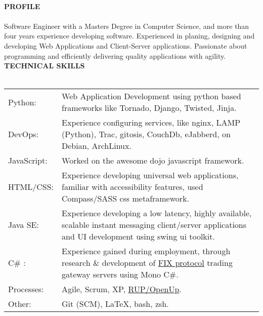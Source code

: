 \documentclass[10pt]{article}
\newcommand{\lineunder}{\vspace*{-10pt} \\ \hspace*{-18pt} \hrulefill \vspace{2pt}\\}
\newcommand{\header}[1]{{\hspace*{-15pt}\vspace*{-0pt}\\ \uppercase{\textbf {#1}}}  \lineunder}
\begin{document}
\header{Profile}
Software Engineer with a Masters Degree in Computer Science, and more than four years experience developing software.
Experienced in planing, designing and developing Web Applications and Client-Server applications.
Passionate about programming and efficiently delivering quality applications with agility.
\vspace{5pt}
\header{Technical Skills}
\begin{tabular*}{\textwidth}{p{3cm}p{}}
    Python: & Web Application Development using python based frameworks like Tornado, Django, Twisted, Jinja.  \\
    DevOps: & Experience configuring services, like nginx, LAMP (Python), Trac, gitosis, CouchDb, eJabberd, on Debian, ArchLinux. \\
    JavaScript: & Worked on the awesome dojo javascript framework. \\
    HTML/CSS: & Experience developing universal web applications, familiar with accessibility features, used Compass/SASS css metaframework. \\
    Java SE: & Experience developing a low latency, highly available, scalable instant messaging client/server applications and UI development using swing ui toolkit. \\
    C\# : & Experience gained during employment, through research \& development of \href{http://en.wikipedia.org/wiki/FIX_protocol}{FIX protocol} trading gateway servers using Mono C\#. \\
    Processes: & Agile, Scrum, XP, \href{http://en.wikipedia.org/wiki/Unified\_process}{RUP/OpenUp}. \\
    Other: & Git (SCM), \LaTeX, bash, zsh.\\
\end{tabular*}
\end{document}
